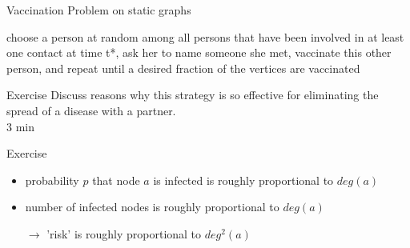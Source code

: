\documentclass{beamer}
\begin{document}
\begin{frame}{Vaccination Problem on static graphs}
  \begin{tcolorbox}[title=Neighbourhood Vacination protocol]
      choose a person at random among all persons that have been involved in at least one contact at time t*, ask her to name someone she met, vaccinate this other person, and repeat until a desired fraction of the vertices are vaccinated
  \end{tcolorbox}

  \begin{center}
  \end{center}
\end{frame}

\begin{frame}{Exercise}
  \centering \large
  Discuss reasons why this strategy is so effective for eliminating the spread of a disease with a partner. \\
  \hfill \tiny 3 min
\end{frame}
\begin{frame}{Exercise}
  \begin{itemize}
    \item probability $p$ that node $a$ is infected is roughly proportional to $deg(a)$
    \item number of infected nodes is roughly proportional to $deg(a)$
    \item[$\rightarrow$] 'risk' is roughly proportional to $deg^2(a)$
  \end{itemize}
\end{frame}
\end{document}
